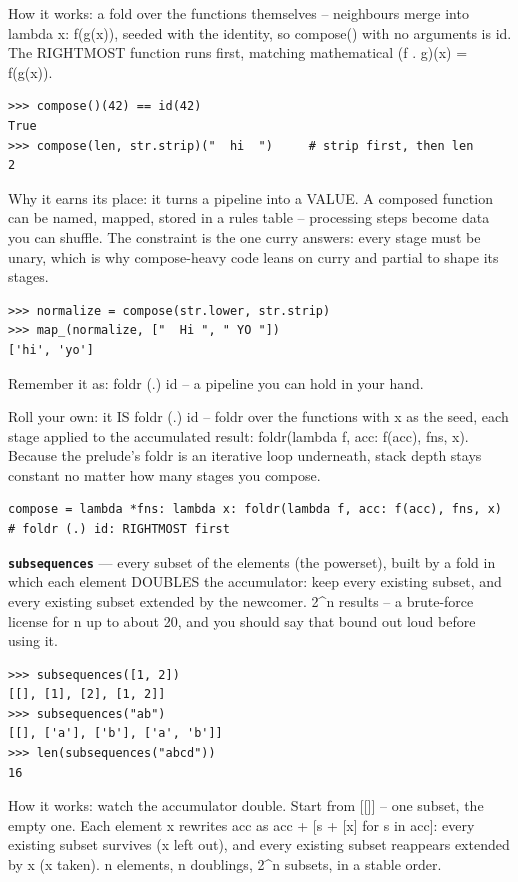 \documentclass[10pt,letterpaper]{article}
\begin{document}
How it works: a fold over the functions themselves -- neighbours merge into lambda x: f(g(x)), seeded with the identity, so compose() with no arguments is id. The RIGHTMOST function runs first, matching mathematical (f . g)(x) = f(g(x)).

\begin{lstlisting}[style=ex]
>>> compose()(42) == id(42)
True
>>> compose(len, str.strip)("  hi  ")     # strip first, then len
2
\end{lstlisting}

Why it earns its place: it turns a pipeline into a VALUE. A composed function can be named, mapped, stored in a rules table -- processing steps become data you can shuffle. The constraint is the one curry answers: every stage must be unary, which is why compose-heavy code leans on curry and partial to shape its stages.

\begin{lstlisting}[style=ex]
>>> normalize = compose(str.lower, str.strip)
>>> map_(normalize, ["  Hi ", " YO "])
['hi', 'yo']
\end{lstlisting}

Remember it as: foldr (.) id -- a pipeline you can hold in your hand.


Roll your own: it IS foldr (.) id -- foldr over the functions with x as the seed, each stage applied to the accumulated result: foldr(lambda f, acc: f(acc), fns, x). Because the prelude's foldr is an iterative loop underneath, stack depth stays constant no matter how many stages you compose.

\begin{lstlisting}[style=ex]
compose = lambda *fns: lambda x: foldr(lambda f, acc: f(acc), fns, x)  # foldr (.) id: RIGHTMOST first
\end{lstlisting}
\textbf{\texttt{subsequences}} --- every subset of the elements (the powerset), built by a fold in which each element DOUBLES the accumulator: keep every existing subset, and every existing subset extended by the newcomer. 2\^{}n results -- a brute-force license for n up to about 20, and you should say that bound out loud before using it.
\begin{lstlisting}[style=ex]
>>> subsequences([1, 2])
[[], [1], [2], [1, 2]]
>>> subsequences("ab")
[[], ['a'], ['b'], ['a', 'b']]
>>> len(subsequences("abcd"))
16
\end{lstlisting}

How it works: watch the accumulator double. Start from [[]] -- one subset, the empty one. Each element x rewrites acc as acc + [s + [x] for s in acc]: every existing subset survives (x left out), and every existing subset reappears extended by x (x taken). n elements, n doublings, 2\^{}n subsets, in a stable order.
\end{document}
